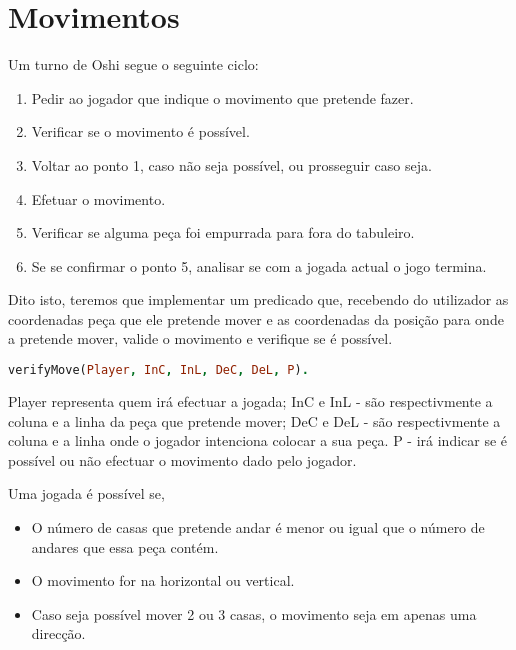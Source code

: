 \documentclass[a4paper]{article}
\begin{document}
\clearpage

\section{Movimentos}

Um turno de Oshi segue o seguinte ciclo:

\begin{enumerate}
	\item Pedir ao jogador que indique o movimento que pretende fazer.
	\item Verificar se o movimento é possível.
	\item Voltar ao ponto 1, caso não seja possível, ou prosseguir caso seja.
	\item Efetuar o movimento.
	\item Verificar se alguma peça foi empurrada para fora do tabuleiro.
	\item Se se confirmar o ponto 5, analisar se com a jogada actual o jogo termina.
\end{enumerate}

Dito isto, teremos que implementar um predicado que, recebendo do utilizador as coordenadas peça que ele pretende mover e as coordenadas da posição para onde a pretende mover, valide o movimento e verifique se é possível.
\bigskip
\begin{lstlisting}[language=Prolog]
verifyMove(Player, InC, InL, DeC, DeL, P).
\end{lstlisting}
\bigskip

Player representa quem irá efectuar a jogada;
\newline
InC e InL - são respectivmente a coluna e a linha da peça que pretende mover;\newline
DeC e DeL - são respectivmente a coluna e a linha onde o jogador intenciona 		colocar a sua peça.\newline
P - irá indicar se é possível ou não efectuar o movimento dado pelo jogador.
\bigskip

Uma jogada é possível se,
\begin{itemize}
	\item O número de casas que pretende andar é menor ou igual que o número de andares que essa peça contém.
	\item O movimento for na horizontal ou vertical.
	\item Caso seja possível mover 2 ou 3 casas, o movimento seja em apenas uma direcção.
	
\end{itemize}
\bigskip
\end{document}
